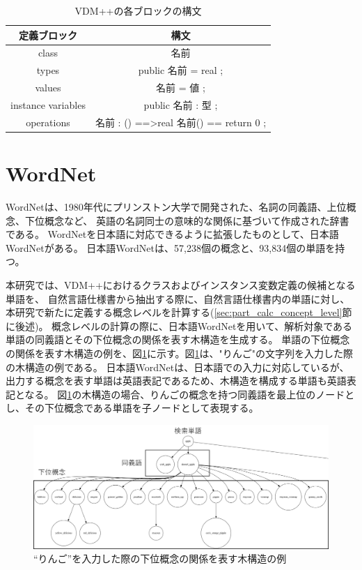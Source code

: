 \begin{table}[t]
    \begin{center}      
        \caption{VDM++の各ブロックの構文}\label{table:vdm_syntax}
        \begin{tabular}{c|c}
        定義ブロック  & 構文　\\ \hline \hline
        class & 名前 \\ \hline
        types	 & public 名前 = real ;\\ \hline
        values  & 名前 = 値 ;\\ \hline
        instance variables & public 名前 : 型 ;\\ \hline
        operations & 名前 : () ==\textgreater real 名前() == return 0 ;\\ \hline 
        \end{tabular}
    \end{center}
\end{table}

\section{WordNet}
\label{sec:wordNet}
WordNetは、1980年代にプリンストン大学で開発された、名詞の同義語、上位概念、下位概念など、
英語の名詞同士の意味的な関係に基づいて作成された辞書である\cite{wordNet}。
WordNetを日本語に対応できるように拡張したものとして、日本語WordNetがある\cite{jaWordNet}。
日本語WordNetは、57,238個の概念と、93,834個の単語を持つ。

本研究では、VDM++におけるクラスおよびインスタンス変数定義の候補となる単語を、
自然言語仕様書から抽出する際に、自然言語仕様書内の単語に対し、本研究で新たに定義する概念レベルを計算する(\ref{sec:part_calc_concept_level}節に後述)。
概念レベルの計算の際に、日本語WordNetを用いて、解析対象である単語の同義語とその下位概念の関係を表す木構造を生成する。
単語の下位概念の関係を表す木構造の例を、図\ref{fig:tree_structure}に示す。図\ref{fig:tree_structure}は、"りんご"の文字列を入力した際の木構造の例である。
日本語WordNetは、日本語での入力に対応しているが、出力する概念を表す単語は英語表記であるため、木構造を構成する単語も英語表記となる。
図\ref{fig:tree_structure}の木構造の場合、りんごの概念を持つ同義語を最上位のノードとし、その下位概念である単語を子ノードとして表現する。

\begin{figure}[t]
    \begin{center}
        \includegraphics[width=1.0\columnwidth]{image/tree_structure.png}
        \caption{``りんご''を入力した際の下位概念の関係を表す木構造の例}
        \label{fig:tree_structure}
    \end{center}
\end{figure}

